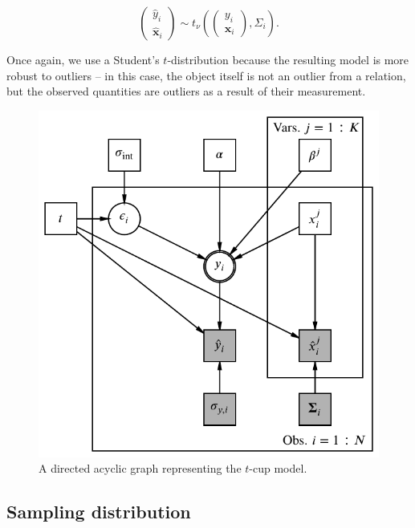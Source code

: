 \documentclass[fleqn,usenatbib]{mnras}
\newcommand{\studentt}[2]{t_\nu \left( #1, #2 \right)}
\newcommand{\depvar}{y_i}
\newcommand{\indepvars}{\boldsymbol{x}_i}
\newcommand{\obsdep}{\hat{y}_i}
\newcommand{\obsindep}{\hat{\boldsymbol{x}}_i}
\newcommand{\obserr}{\Sigma_i}
\begin{document}
\begin{equation}
    \begin{pmatrix}
        \obsdep \\ \obsindep
    \end{pmatrix}
    \sim
    \studentt{
        \begin{pmatrix}
            \depvar \\ \indepvars
        \end{pmatrix}
    }{
        \obserr
    }.
\end{equation}

Once again, we use a Student's $t$-distribution because the resulting model is
more robust to outliers -- in this case, the object itself is not an outlier
from a relation, but the observed quantities are outliers as a result of their
measurement.

\begin{figure}
	\includegraphics[width=\columnwidth]{graphics/dag.pdf}
    \caption{A directed acyclic graph representing the $t$-cup model.}
    \label{fig:formalism.dag}
\end{figure}

\subsection{Sampling distribution}
\label{sec:formalism.sampling}
\end{document}
